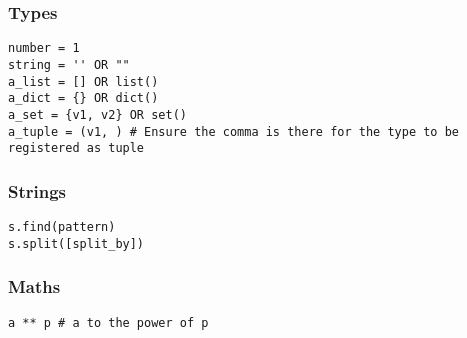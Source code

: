 \subsubsection{Types}
\begin{lstlisting}[style=PyStyle]
number = 1
string = '' OR ""
a_list = [] OR list()
a_dict = {} OR dict()
a_set = {v1, v2} OR set()
a_tuple = (v1, ) # Ensure the comma is there for the type to be registered as tuple
\end{lstlisting}

\subsubsection{Strings}
\begin{lstlisting}[style=PyStyle]
s.find(pattern)
s.split([split_by])
\end{lstlisting}

\subsubsection{Maths}
\begin{lstlisting}[style=PyStyle]
a ** p # a to the power of p
\end{lstlisting}


